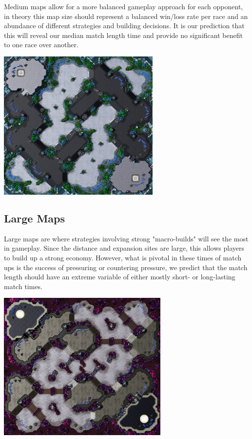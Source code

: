 \documentclass[a4paper,12pt]{report}
\begin{document}
Medium maps allow for a more balanced gameplay approach for each opponent, in theory this map size should represent a balanced win/loss rate per race and an abundance of different strategies and building decisions. It is our prediction that this will reveal our median match length time and provide no significant benefit to one race over another.

\begin{center}
    \captionsetup{type=figure}
    \includegraphics[width=.5\linewidth]{media/mediumMap.png}
\end{center}

\subsection{Large Maps}

Large maps are where strategies involving strong "macro-builds" will see the most in gameplay. Since the distance and expansion sites are large, this allows players to build up a strong economy. However, what is pivotal in these times of match ups is the success of pressuring or countering pressure, we predict that the match length should have an extreme variable of either mostly short- or long-lasting match times. 

\begin{center}
    \captionsetup{type=figure}
    \includegraphics[width=.5\linewidth]{media/LargeMap.png}
\end{center}
\end{document}
